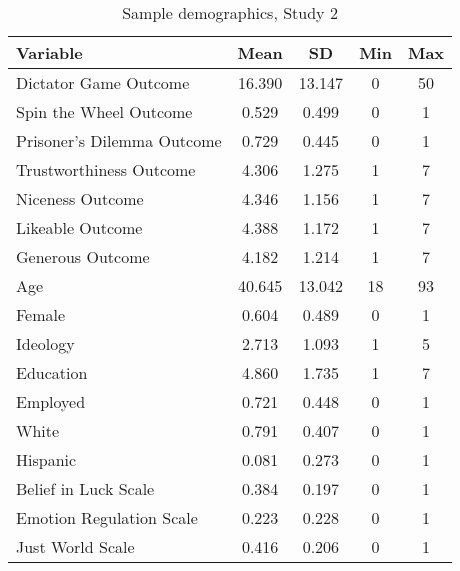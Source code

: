 \renewcommand{\baselinestretch}{1.25}%
\begin{table}[H]
\centering

\begin{threeparttable}
\caption{Sample demographics, Study 2}

\begin{tabular}[t]{lcccc}
\toprule
Variable & Mean & SD & Min & Max\\
\midrule
Dictator Game Outcome & 16.390 & 13.147 & 0 & 50\\
Spin the Wheel Outcome & 0.529 & 0.499 & 0 & 1\\
Prisoner's Dilemma Outcome & 0.729 & 0.445 & 0 & 1\\
Trustworthiness Outcome & 4.306 & 1.275 & 1 & 7\\
Niceness Outcome & 4.346 & 1.156 & 1 & 7\\
Likeable Outcome & 4.388 & 1.172 & 1 & 7\\
Generous Outcome & 4.182 & 1.214 & 1 & 7\\
Age & 40.645 & 13.042 & 18 & 93\\
Female & 0.604 & 0.489 & 0 & 1\\
Ideology & 2.713 & 1.093 & 1 & 5\\
Education & 4.860 & 1.735 & 1 & 7\\
Employed & 0.721 & 0.448 & 0 & 1\\
White & 0.791 & 0.407 & 0 & 1\\
Hispanic & 0.081 & 0.273 & 0 & 1\\
Belief in Luck Scale & 0.384 & 0.197 & 0 & 1\\
Emotion Regulation Scale & 0.223 & 0.228 & 0 & 1\\
Just World Scale & 0.416 & 0.206 & 0 & 1\\
\bottomrule
\end{tabular}
\label{tab:exp2_sample}
\begin{tablenotes}[flushleft]
\scriptsize
\item[\hspace{-5mm}] 
\end{tablenotes}
\end{threeparttable}
\end{table}
\renewcommand{\baselinestretch}{1.67}%
